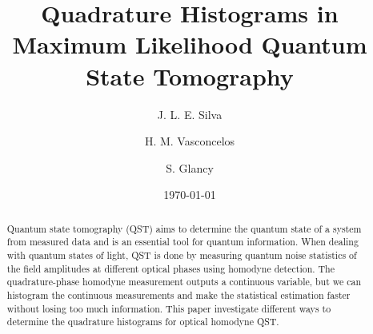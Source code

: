 \documentclass[
reprint,
superscriptaddress,
showpacs,
amsmath,
amssymb,
aps,
pra,
longbibliography
]{revtex4-1}
\begin{document}

\title{Quadrature Histograms in Maximum Likelihood Quantum State Tomography}%
\author{J. L. E. Silva}
\author{H. M. Vasconcelos}
\author{S. Glancy}


\date{\today}%

\begin{abstract}
Quantum state tomography (QST) aims to determine the quantum state of a system from measured data and is an essential tool for quantum information. 
When dealing with quantum states of light, QST is done by measuring  quantum  noise  statistics  of the  field  amplitudes  at different  optical  
phases using homodyne detection. The quadrature-phase homodyne measurement outputs a continuous variable, but we can histogram the continuous 
measurements and make the statistical estimation faster without losing too much information. This paper investigate different ways to determine the 
quadrature histograms for optical homodyne QST.

\end{abstract}

\maketitle

\end{document}
